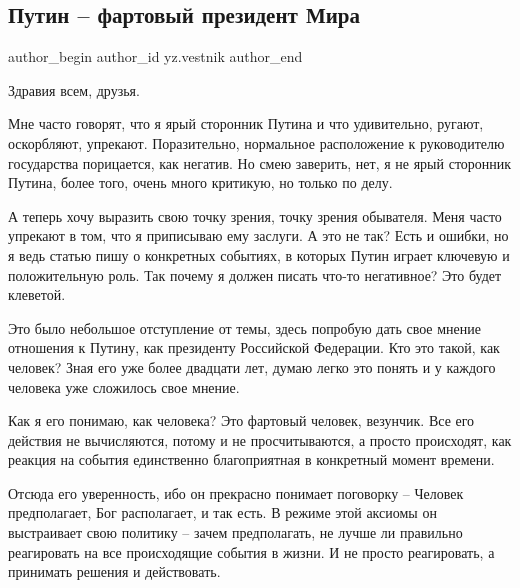  
 
 
 
 
 
\subsection{Путин – фартовый президент Мира}
\label{sec:13_02_2022.yz.vestnik.1.putin_fartovyj_prezident_mira}
 
\ifcmt
 author_begin
   author_id yz.vestnik
 author_end
\fi

Здравия всем, друзья.

Мне часто говорят, что я ярый сторонник Путина и что удивительно, ругают,
оскорбляют, упрекают. Поразительно, нормальное расположение к руководителю
государства порицается, как негатив. Но смею заверить, нет, я не ярый сторонник
Путина, более того, очень много критикую, но только по делу.


А теперь хочу выразить свою точку зрения, точку зрения обывателя. Меня часто
упрекают в том, что я приписываю ему заслуги. А это не так? Есть и ошибки, но я
ведь статью пишу о конкретных событиях, в которых Путин играет ключевую и
положительную роль. Так почему я должен писать что-то негативное? Это будет
клеветой.

Это было небольшое отступление от темы, здесь попробую дать свое мнение
отношения к Путину, как президенту Российской Федерации. Кто это такой, как
человек? Зная его уже более двадцати лет, думаю легко это понять и у каждого
человека уже сложилось свое мнение.

Как я его понимаю, как человека? Это фартовый человек, везунчик. Все его
действия не вычисляются, потому и не просчитываются, а просто происходят, как
реакция на события единственно благоприятная в конкретный момент времени.

Отсюда его уверенность, ибо он прекрасно понимает поговорку – Человек
предполагает, Бог располагает, и так есть. В режиме этой аксиомы он выстраивает
свою политику – зачем предполагать, не лучше ли правильно реагировать на все
происходящие события в жизни. И не просто реагировать, а принимать решения и
действовать.

